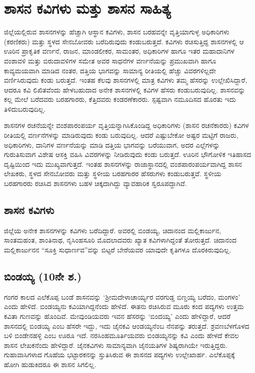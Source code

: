 \chapter{ಶಾಸನ ಕವಿಗಳು ಮತ್ತು ಶಾಸನ ಸಾಹಿತ್ಯ}

ಜಿಲ್ಲೆಯಲ್ಲಿರುವ ಶಾಸನಗಳನ್ನು ಹೆಚ್ಚಾಗಿ ಆಸ್ಥಾನ ಕವಿಗಳು, ಶಾಸನ ಬರಹವನ್ನೇ ವೃತ್ತಿಯಾಗುಳ್ಳ ಅಧಿಕಾರಿಗಳು (ಕರಣಿಕರು) ಮತ್ತು ಸ್ಥಳದ ಸೇನಬೋವರು ಬರೆದಿರುವುದು ಕಂಡುಬರುತ್ತದೆ. ಕವಿಗಳು ರಚಿಸುತ್ತಿದ್ದ ಶಾಸನಗಳಲ್ಲಿ ಆ ಊರಿನ ಪ್ರಾಕೃತಿಕ ವರ್ಣನೆ, ರಾಜನ, ಮಾಂಡಲೀಕರ, ಸಾಮಂತರ, ಅಧಿಕಾರಿಗಳ ಹಾಗೂ ಇತರ ಮಹಾದಾನಿಗಳ ವಂಶಾವಳಿ ಮತ್ತು ಬಿರುದಾವಳಿಗಳ ಸಮೇತ ಅವರ ಸಾಧನೆಗಳ ವರ್ಣನೆಯನ್ನು ಪ್ರಮುಖವಾಗಿ ಹಾಗೂ ಕಾವ್ಯಮಯವಾಗಿ ಮಾಡಿದ ನಂತರ, ದತ್ತಿಯ ಭಾಗವನ್ನು ಸಾಮಾನ್ಯ ರೀತಿಯಲ್ಲಿ ಹೆಚ್ಚು ವಿವರಗಳಿಲ್ಲದೇ ವರ್ಣಿಸಿರುವುದು ಕಂಡು ಬರುತ್ತದೆ. ಇಂತಹ ಕೆಲವು ಶಾಸನಗಳಲ್ಲಿ ಮಾತ್ರ ಕವಿಗಳು ತಮ್ಮ ಹೆಸರನ್ನು ಉಲ್ಲೇಖಿಸಿದ್ದಾರೆ, ಆದರೂ ಕವಿ ಲಿಖಿತವೆಂದು ಹೇಳಬಹುದಾದ ಅನೇಕ ಶಾಸನಗಳಲ್ಲಿ ಕವಿಗಳ ಹೆಸರು ಕಂಡುಬರುವುದಿಲ್ಲ. ಶಾಸನವನ್ನು ಕಲ್ಲ ಮೇಲೆ ಬರೆದವರು ಬರಹಗಾರರು, ಕೆತ್ತಿದವರು ಕಂಡರಣೆಕಾರರು. ಸ್ಪಷ್ಟವಾಗಿ ನಮೂದಿಸದ ಹೊರತು ಇದು ತಿಳಿದುಬರುವುದಿಲ್ಲ.

ಶಾಸನಗಳ ರಚನೆಯನ್ನೇ ವಂಶಪಾರಂಪರ್ಯ ವೃತ್ತಿಯನ್ನಾಗಿಸಿಕೊಂಡಿದ್ದ ಅಧಿಕಾರಿಗಳು (ಶಾಸನ ರಚನೆಕಾರರು) ಕವಿಗಳ ರೀತಿಯಲ್ಲಿ ವರ್ಣನೆಗಳನ್ನು ಮಾಡಿರುವುದು ಕಂಡು ಬರುವುದಿಲ್ಲ. ಆದರೆ ಎಷ್ಟುಬೇಕೋ ಅಷ್ಟರ ಮಟ್ಟಿಗೆ ರಾಜರು, ಅಧಿಕಾರಿಗಳು, ದಾನಿಗಳ ವರ್ಣನೆಯನ್ನು ಮಾಡಿ ದತ್ತಿಯ ಭಾಗವನ್ನು ಬರೆಯುವಾಗ, ಅದರ ಎಲ್ಲೆಗಳನ್ನು ಗುರುತಿಸುವಾಗ ವಿಶೇಷ ಆಸಕ್ತಿ ವಹಿಸಿ ವಿವರಗಳನ್ನು ನೀಡಿರುವುದು ಕಂಡು ಬರುತ್ತದೆ. ಊರಿನ ಭೌಗೋಳಿಕ ಇತಿಹಾಸದ ದೃಷ್ಟಿಯಿಂದ ಇದು ಮುಖ್ಯವಾಗುತ್ತದೆ. ಇಂತಹ ಶಾಸನಗಳನ್ನು ರಾಜಾಸ್ಥಾನದಲ್ಲಿ ವಂಶಪಾರಂಪರ್ಯವಾಗಿದ್ದ ಶಾಸನ ಲೇಖಕರು, ಸ್ಥಳದ ಸೇನಬೋವರು ಮತ್ತು ಸ್ಥಳೀಯ ಬರಹಗಾರರ ಹೆಸರುಗಳು ಕಂಡು\-ಬರುತ್ತವೆ. ಸ್ಥಳೀಯ ಬರಹಗಾರರು ರಚಿಸಿದ ಶಾಸನಗಳು ಬಹಳ ಚಿಕ್ಕದಾಗಿದ್ದು ವ್ಯಾವಹಾರಿಕ ಸ್ವರೂಪದ್ದಾಗಿವೆ.

\section*{ಶಾಸನ ಕವಿಗಳು}

ಜಿಲ್ಲೆಯ ಅನೇಕ ಶಾಸನಗಳನ್ನು ಕವಿಗಳು ಬರೆದಿದ್ದಾರೆ. ಅವರಲ್ಲಿ ಬಿಂಡಯ್ಯ, ಚಿದಾನಂದ ಮಲ್ಲಿಕಾರ್ಜುನ, ಸಾಂತಮಹಂತ, ಶಾಂತಿನಾಥ, ನೃಸಿಂಹಸೂರಿ ಮೊದಲಾದವರು ಖ್ಯಾತ ಕವಿಗಳಾಗಿದ್ದಂತೆ ತೋರುತ್ತದೆ. ಚಿದಾನಂದ ಮಲ್ಲಿಕಾರ್ಜುನನ “ಸೂಕ್ತಿ ಸುಧಾರ್ಣವ”ವನ್ನು ಬಿಟ್ಟರೆ ಬೇರೆಯವರ ಯಾವುದೇ ಕೃತಿಗಳೂ ದೊರಕಿರುವುದಿಲ್ಲ.


\section*{ಬಿಂಡಯ್ಯ (10ನೇ ಶ.)}

ಗಂಗರ ಕಾಲದ ಎಲೆಕೊಪ್ಪ ಬಂಡೆ ಶಾಸನವನ್ನು ‘ಶ‍್ರೀಮದೇಳಾಚಾರ್ಯ್ಯರ ವರಗುಡ್ಡ ಬಿಣ್ಡಯ್ಯ ಬರೆದಂ, ಮಂಗಳಂ’ ಎಂದು ಹೇಳಿದೆ. ಬಿಂಡಯ್ಯನು ಕವಿಯಾಗಿದ್ದನೆಂದು ಹೇಳಿದೆ. ಈತನು ರಚಿಸಿರುವ ಮೂರು ಕಂದ ಪದ್ಯಗಳು ಉತ್ತಮ ಕವಿತಾ ಗುಣವನ್ನು ಹೊಂದಿವೆ. ಮೇವುಂಡಿಯವರು ಇವನ ಹೆಸರನ್ನು ‘ಬಿಂದಯ್ಯ’ ಎಂದು ಹೇಳಿದ್ದಾರೆ, ಆದರೆ ಶಾಸನದಲ್ಲಿ ಬಿಂಡಯ್ಯ ಎಂಬ ಹೆಸರೇ ಇದ್ದು, ಇದು ಜೈನಕವಿ ಆಂಡಯ್ಯನೆಂಬ ನೆನಪನ್ನು ತರುತ್ತದೆ. ಶ್ರವಣಬೆಳಗೊಳದ ಬಳಿ ಬಿಂಡೇನಹಳ್ಳಿ ಎಂಬ ಊರೂ ಇದೆ. ನರಸಿಂಹಮೂರ್ತಿಯವರು ಬಿಂಡಯ್ಯನನ್ನು ಕವಿ ಎಂದು ಹೇಳದೆ ಕೇವಲ ಶಾಸನ ಲೇಖಕನೆಂದು ಹೇಳಿದ್ದಾರೆ. ಜೈನಕವಿಗಳು ಸಾಮಾನ್ಯವಾಗಿ ಜೈನಯತಿಗಳ ಶಿಷ್ಯರಾಗಿಯೇ ಇರುತ್ತಿದ್ದರು. ಗುಹಾವಾಸಿಗಳಾದ ಗೊಹೆಯ ಭಟ್ಟಾರಕನನ್ನು ಸ್ತುತಿಸಿರುವ ಈ ಶಾಸನದ ಪದ್ಯಗಳು ಉಲ್ಲೇಖಾರ್ಹ. ಎಲೆಕೊಪ್ಪಕ್ಕೆ ಹೋಗಿ ಹುಡುಕಿದರೂ ಈ ಶಾಸನ ಸಿಗಲಿಲ್ಲ.

